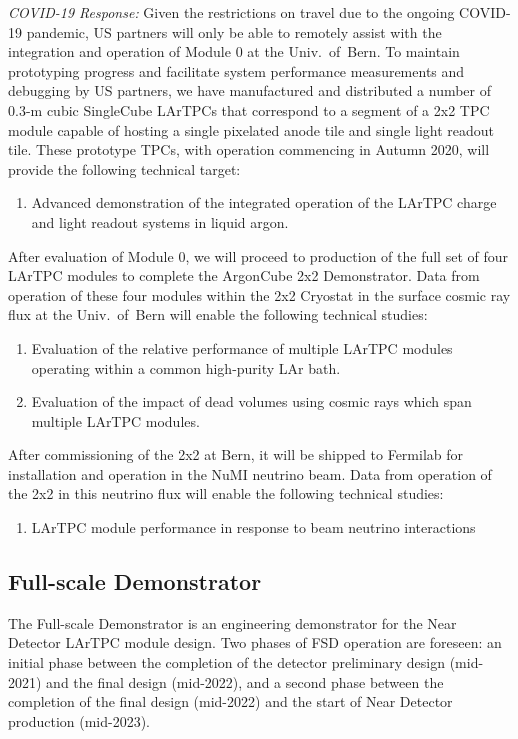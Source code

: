 {\it COVID-19 Response:} Given the restrictions on travel due to the ongoing COVID-19 pandemic, US partners will only be able to remotely assist with the integration and operation of Module 0 at the Univ.~of~Bern.  
To maintain prototyping progress and facilitate system performance measurements and debugging by US partners, we have manufactured and distributed a number of 0.3-m cubic SingleCube LArTPCs that correspond to a segment of a 2x2 TPC module capable of hosting a single pixelated anode tile and single light readout tile.  
These prototype TPCs, with operation commencing in Autumn 2020, will provide the following technical target:
\begin{enumerate}
    \item Advanced demonstration of the integrated operation of the LArTPC charge and light readout systems in liquid argon.
\end{enumerate}

After evaluation of Module 0, we will proceed to production of the full set of four LArTPC modules to complete the ArgonCube 2x2 Demonstrator.  
Data from operation of these four modules within the 2x2 Cryostat in the surface cosmic ray flux at the Univ.~of~Bern will enable the following technical studies:
\begin{enumerate}
    \item Evaluation of the relative performance of multiple LArTPC modules operating within a common high-purity LAr bath.
    \item Evaluation of the impact of dead volumes using cosmic rays which span multiple LArTPC modules.
\end{enumerate}

After commissioning of the 2x2 at Bern, it will be shipped to Fermilab for installation and operation in the NuMI neutrino beam.  
Data from operation of the 2x2 in this neutrino flux will enable the following technical studies:
\begin{enumerate}
    \item LArTPC module performance in response to beam neutrino interactions
\end{enumerate}

\subsection{Full-scale Demonstrator}

The Full-scale Demonstrator is an engineering demonstrator for the Near Detector LArTPC module design.  
Two phases of FSD operation are foreseen: an initial phase between the completion of the detector preliminary design (mid-2021) and the final design (mid-2022), and a second phase between the completion of the final design (mid-2022) and the start of Near Detector production (mid-2023).

